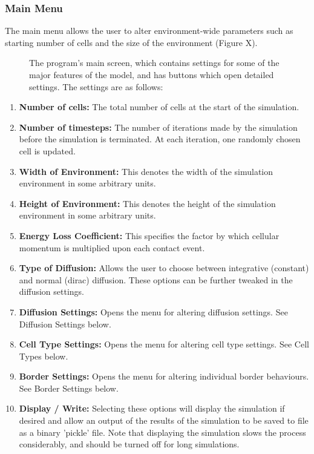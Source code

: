 \documentclass[11.5pt]{article}
\begin{document}
\subsubsection{Main Menu}

The main menu allows the user to alter environment-wide parameters such 
as starting number of cells and the size of the environment (Figure X). 



\begin{figure}[H]
\centering
\caption{The program's main screen, which contains settings 
for some of the major features of the model, and has buttons which open 
detailed settings. The settings are as follows:}
\end{figure}



\begin{enumerate}
\item {\bfseries Number of cells:} The total number of cells at the start 
of the simulation.
\item {\bfseries Number of timesteps:} The number of iterations made by 
the simulation before the simulation is terminated. At each iteration, 
one randomly chosen cell is updated.
\item {\bfseries Width of Environment:} This denotes the width of the 
simulation environment in some arbitrary units.
\item {\bfseries Height of Environment:} This denotes the height of the 
simulation environment in some arbitrary units.
\item {\bfseries Energy Loss Coefficient: }This specifies the factor by 
which cellular momentum is multiplied upon each contact event.
\item {\bfseries Type of Diffusion:} Allows the user to choose between 
integrative (constant) and normal (dirac) diffusion. These options can 
be further tweaked in the diffusion settings.
\item {\bfseries Diffusion Settings:} Opens the menu for altering 
diffusion settings. See Diffusion Settings below.
\item {\bfseries Cell Type Settings: }Opens the menu for altering cell 
type settings. See Cell Types below.
\item {\bfseries Border Settings: }Opens the menu for altering individual 
border behaviours. See Border Settings below.
\item {\bfseries Display / Write:} Selecting these options will display 
the simulation if desired and allow an output of the results of the 
simulation to be saved to file as a binary 'pickle' file. Note that 
displaying the simulation slows the process considerably, and should be 
turned off for long simulations.
\setcounter{numberedCntG}{\theenumi}
\end{enumerate}
\end{document}
